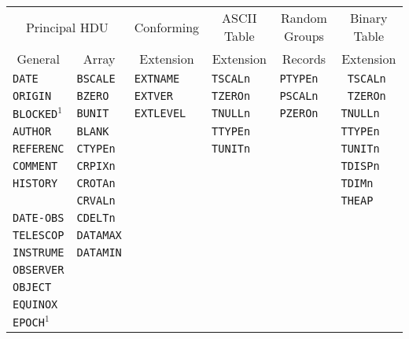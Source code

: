 \begin{table}[htpb]        
\begin{center}
\begin{tabular}{llllll}  \\
           \multicolumn{2}{c}{Principal HDU}                       & 
\multicolumn{1}{c}{Conforming}   & \multicolumn{1}{c}{ASCII Table} & 
\multicolumn{1}{c}{Random Groups}& \multicolumn{1}{c}{Binary Table}

\\ 
\multicolumn{1}{c}{General}      &\multicolumn{1}{c}{Array}        & 
\multicolumn{1}{c}{Extension}    & \multicolumn{1}{c}{Extension}   & 
\multicolumn{1}{c}{Records}    & \multicolumn{1}{c}{Extension}     \\
\hline
{\tt DATE}     & {\tt BSCALE}   & {\tt EXTNAME}   & {\tt TSCALn}    &
{\tt PTYPEn}    & {\tt
TSCALn}   \\
{\tt ORIGIN}   & {\tt BZERO}    & {\tt EXTVER}    & {\tt TZEROn}    &
{\tt PSCALn}    & {\tt
TZEROn}   \\
{\tt BLOCKED}$^{1}$ & {\tt BUNIT}    & {\tt EXTLEVEL}  & {\tt TNULLn}   
& {\tt PZEROn}    &
{\tt TNULLn}    \\
{\tt AUTHOR}   & {\tt BLANK}    &                 & {\tt TTYPEn}    &        
        &{\tt TTYPEn}  
\\
{\tt REFERENC} & {\tt CTYPEn}   &                 & {\tt TUNITn}    &      
          &{\tt TUNITn}
\\ 
{\tt COMMENT}  & {\tt CRPIXn}   &                 &                 &              
  &{\tt TDISPn}    \\   
    
{\tt HISTORY}  & {\tt CROTAn}   &                 &                 &               
 &{\tt TDIMn}     \\    
\verb*+        +& {\tt CRVALn}  &                 &                 &                
&{\tt THEAP}     \\       

{\tt DATE-OBS} & {\tt CDELTn}   &                 &                 &              
  &                \\        
{\tt TELESCOP} & {\tt DATAMAX}  &                 &                 &            
    &                \\       

{\tt INSTRUME} & {\tt DATAMIN}  &                 &                 &             
   &                \\        

    
{\tt OBSERVER} &                &                 &                 &                 & 
              \\        
{\tt OBJECT}   &                &                 &                 &                 &    
           \\        
{\tt EQUINOX}  &                &                 &                 &                 &   
            \\        
{\tt EPOCH}$^{1}$  &                &                 &                 &                 &    
           \\  \hline
\end{tabular}
\end{center}


\end{table}
